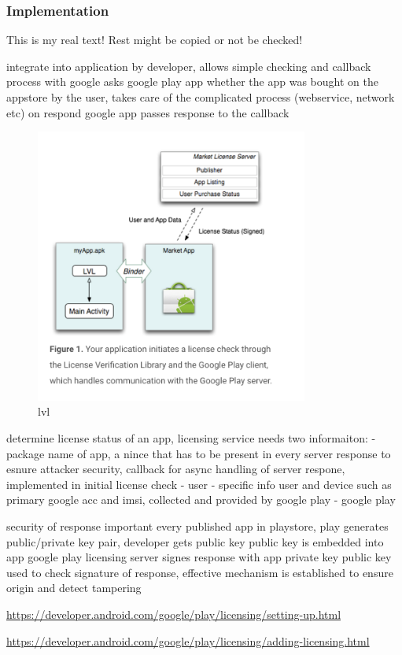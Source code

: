 \subsubsection{Implementation}\label{subsection:license-google-implementation}
This is my real text! Rest might be copied or not be checked!

%
integrate into application by developer, allows simple checking and callback process with google
asks google play app whether the app was bought on the appstore by the user, takes care of the complicated process (webservice, network etc)
on respond google app passes response to the callback
\begin{figure}[h]
    \centering
    \includegraphics[width=0.8\textwidth]{data/lvl.png}
    \caption{lvl}
    \label{fig:lvl}
\end{figure}

determine license status of an app, licensing service needs two informaiton:
- package name of app, a nince that has to be present in every server response to esnure attacker security, callback for async handling of server respone, implemented in initial license check - user
- specific info user and device such as primary google acc and imsi, collected and provided by google play - google play

security of response important
every published app in playstore, play generates public/private key pair, developer gets public key
public key is embedded into app
google play licensing server signes response with app private key
public key used to check signature of response, effective mechanism is established to ensure origin and detect tampering
\cite{munteanLicensing}
%

\url{https://developer.android.com/google/play/licensing/setting-up.html}

\url{https://developer.android.com/google/play/licensing/adding-licensing.html}
